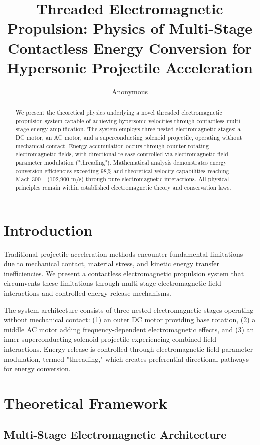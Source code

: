 \documentclass[12pt,a4paper]{article}
\title{Threaded Electromagnetic Propulsion: Physics of Multi-Stage Contactless Energy Conversion for Hypersonic Projectile Acceleration}
\author{Anonymous}
\begin{document}
\maketitle

\begin{abstract}
We present the theoretical physics underlying a novel threaded electromagnetic propulsion system capable of achieving hypersonic velocities through contactless multi-stage energy amplification. The system employs three nested electromagnetic stages: a DC motor, an AC motor, and a superconducting solenoid projectile, operating without mechanical contact. Energy accumulation occurs through counter-rotating electromagnetic fields, with directional release controlled via electromagnetic field parameter modulation ("threading"). Mathematical analysis demonstrates energy conversion efficiencies exceeding 98\% and theoretical velocity capabilities reaching Mach 300+ (102,900 m/s) through pure electromagnetic interactions. All physical principles remain within established electromagnetic theory and conservation laws.
\end{abstract}

\section{Introduction}

Traditional projectile acceleration methods encounter fundamental limitations due to mechanical contact, material stress, and kinetic energy transfer inefficiencies. We present a contactless electromagnetic propulsion system that circumvents these limitations through multi-stage electromagnetic field interactions and controlled energy release mechanisms.

The system architecture consists of three nested electromagnetic stages operating without mechanical contact: (1) an outer DC motor providing base rotation, (2) a middle AC motor adding frequency-dependent electromagnetic effects, and (3) an inner superconducting solenoid projectile experiencing combined field interactions. Energy release is controlled through electromagnetic field parameter modulation, termed "threading," which creates preferential directional pathways for energy conversion.

\section{Theoretical Framework}

\subsection{Multi-Stage Electromagnetic Architecture}
\end{document}
